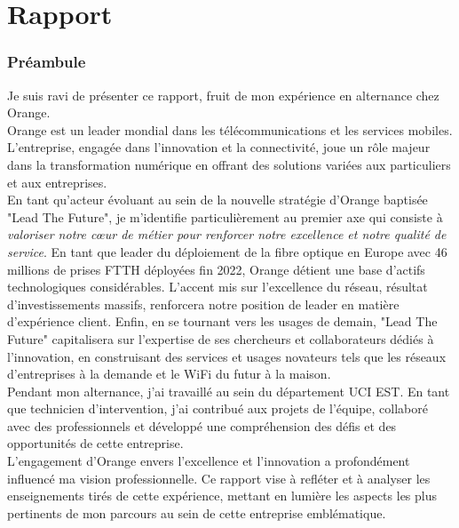 \documentclass[12pt, a4paper]{article}
\begin{document}
\part{\Large{Rapport}}
\newpage
\pagestyle{fancy}
\section{Préambule}
Je suis ravi de présenter ce rapport, fruit de mon expérience en alternance chez Orange.\\

Orange est un leader mondial dans les télécommunications et les services mobiles.
L'entreprise, engagée dans l'innovation et la connectivité, joue un rôle majeur dans la
transformation numérique en offrant des solutions variées aux particuliers et aux entreprises.\\

En tant qu'acteur évoluant au sein de la nouvelle
stratégie d'Orange baptisée "Lead The Future",
je m'identifie particulièrement au premier axe
qui consiste à \textit{valoriser notre cœur de métier pour
renforcer notre excellence et notre qualité de
service}. En tant que leader du déploiement de la
fibre optique en Europe avec 46 millions de prises
FTTH déployées fin 2022,
Orange détient une base d'actifs technologiques
considérables. L'accent mis sur l'excellence du
réseau, résultat d'investissements massifs,
renforcera notre position de leader en matière
d'expérience client. Enfin,
en se tournant vers les usages
de demain, "Lead The Future" capitalisera sur
l'expertise de ses chercheurs et collaborateurs
dédiés à l'innovation, en construisant des services
et usages novateurs tels que les réseaux
d'entreprises à la demande et le WiFi du futur à
la maison.\\

Pendant mon alternance, j'ai travaillé au sein du département \gls{UCI} EST.
En tant que technicien d'intervention, j'ai contribué aux projets de l'équipe, collaboré avec des
professionnels et développé une compréhension des défis et des opportunités
de cette entreprise.\\


L'engagement d'Orange envers l'excellence et l'innovation a profondément influencé ma vision
professionnelle. Ce rapport vise à refléter et à analyser les enseignements tirés de cette
expérience, mettant en lumière les aspects les plus pertinents de mon parcours au sein de
cette entreprise emblématique.\\
\end{document}
